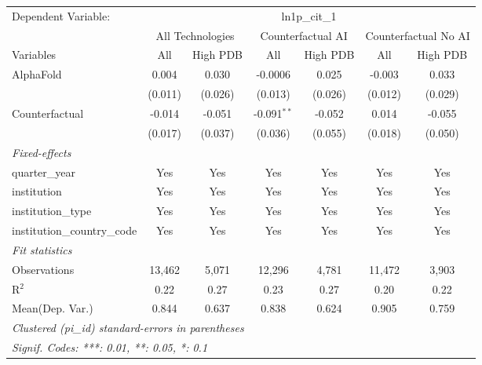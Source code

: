 \begingroup
\centering
\begin{tabular}{lcccccc}
   \tabularnewline \midrule \midrule
   Dependent Variable: & \multicolumn{6}{c}{ln1p\_cit\_1}\\
 & \multicolumn{2}{c}{All Technologies} & \multicolumn{2}{c}{Counterfactual AI} & \multicolumn{2}{c}{Counterfactual No AI} \\
\cmidrule(lr){1-1}\cmidrule(lr){2-3} \cmidrule(lr){4-5} \cmidrule(lr){6-7}
Variables & \multicolumn{1}{c}{All} & \multicolumn{1}{c}{High PDB} & \multicolumn{1}{c}{All} & \multicolumn{1}{c}{High PDB} & \multicolumn{1}{c}{All} & \multicolumn{1}{c}{High PDB} \\
\cmidrule(lr){1-1}\cmidrule(lr){2-2} \cmidrule(lr){3-3} \cmidrule(lr){4-4} \cmidrule(lr){5-5} \cmidrule(lr){6-6} \cmidrule(lr){7-7}
   AlphaFold                    & 0.004   & 0.030   & -0.0006       & 0.025   & -0.003  & 0.033\\   
                                & (0.011) & (0.026) & (0.013)       & (0.026) & (0.012) & (0.029)\\   
   Counterfactual               & -0.014  & -0.051  & -0.091$^{**}$ & -0.052  & 0.014   & -0.055\\   
                                & (0.017) & (0.037) & (0.036)       & (0.055) & (0.018) & (0.050)\\   
   \midrule
   \emph{Fixed-effects}\\
   quarter\_year                & Yes     & Yes     & Yes           & Yes     & Yes     & Yes\\  
   institution                  & Yes     & Yes     & Yes           & Yes     & Yes     & Yes\\  
   institution\_type            & Yes     & Yes     & Yes           & Yes     & Yes     & Yes\\  
   institution\_country\_code   & Yes     & Yes     & Yes           & Yes     & Yes     & Yes\\  
   \midrule
   \emph{Fit statistics}\\
   Observations                 & 13,462  & 5,071   & 12,296        & 4,781   & 11,472  & 3,903\\  
   R$^2$                        & 0.22    & 0.27    & 0.23          & 0.27    & 0.20    & 0.22\\  
Mean(Dep. Var.) & 0.844 & 0.637 & 0.838 & 0.624 & 0.905 & 0.759 \\
   \midrule \midrule
   \multicolumn{7}{l}{\emph{Clustered (pi\_id) standard-errors in parentheses}}\\
   \multicolumn{7}{l}{\emph{Signif. Codes: ***: 0.01, **: 0.05, *: 0.1}}\\
\end{tabular}
\par\endgroup

